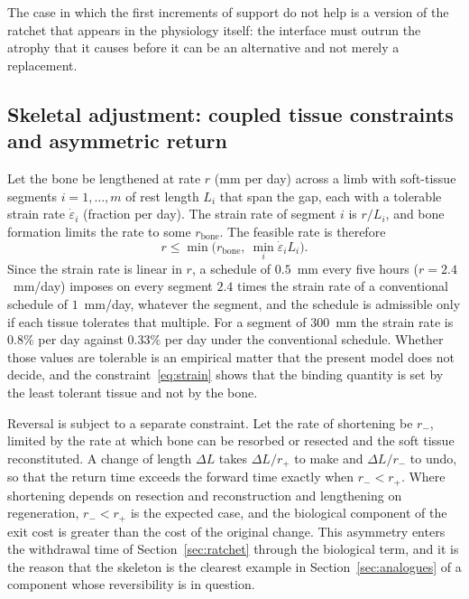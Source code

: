 \documentclass[11pt]{article}
\theoremstyle{plain}
\theoremstyle{definition}
\theoremstyle{remark}
\begin{document}
The case in which the first increments of support do not help is a version of the ratchet that appears in the physiology itself: the interface must outrun the atrophy that it causes before it can be an alternative and not merely a replacement.

\subsection{Skeletal adjustment: coupled tissue constraints and asymmetric return}

Let the bone be lengthened at rate $r$ (mm per day) across a limb with soft-tissue segments $i=1,\dots,m$ of rest length $L_i$ that span the gap, each with a tolerable strain rate $\dot\varepsilon_i$ (fraction per day). The strain rate of segment $i$ is $r/L_i$, and bone formation limits the rate to some $r_{\mathrm{bone}}$. The feasible rate is therefore
\begin{equation}\label{eq:strain}
r\le\min\Big(r_{\mathrm{bone}},\ \min_i\dot\varepsilon_iL_i\Big).
\end{equation}
Since the strain rate is linear in $r$, a schedule of $0.5$~mm every five hours ($r=2.4$~mm/day) imposes on every segment $2.4$ times the strain rate of a conventional schedule of $1$~mm/day, whatever the segment, and the schedule is admissible only if each tissue tolerates that multiple. For a segment of $300$~mm the strain rate is $0.8\%$ per day against $0.33\%$ per day under the conventional schedule. Whether those values are tolerable is an empirical matter that the present model does not decide, and the constraint~\eqref{eq:strain} shows that the binding quantity is set by the least tolerant tissue and not by the bone.

Reversal is subject to a separate constraint. Let the rate of shortening be $r_-$, limited by the rate at which bone can be resorbed or resected and the soft tissue reconstituted. A change of length $\Delta L$ takes $\Delta L/r_+$ to make and $\Delta L/r_-$ to undo, so that the return time exceeds the forward time exactly when $r_-<r_+$. Where shortening depends on resection and reconstruction and lengthening on regeneration, $r_-<r_+$ is the expected case, and the biological component of the exit cost is greater than the cost of the original change. This asymmetry enters the withdrawal time of Section~\ref{sec:ratchet} through the biological term, and it is the reason that the skeleton is the clearest example in Section~\ref{sec:analogues} of a component whose reversibility is in question.
\end{document}
